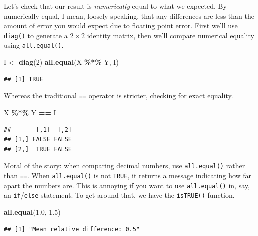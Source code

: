 \documentclass[
  12pt,
  oneside,openany]{book}
\newenvironment{Shaded}{\begin{snugshade}}{\end{snugshade}}
\newcommand{\DecValTok}[1]{\textcolor[rgb]{0.00,0.00,0.81}{#1}}
\newcommand{\FloatTok}[1]{\textcolor[rgb]{0.00,0.00,0.81}{#1}}
\newcommand{\KeywordTok}[1]{\textcolor[rgb]{0.13,0.29,0.53}{\textbf{#1}}}
\newcommand{\NormalTok}[1]{#1}
\newcommand{\OperatorTok}[1]{\textcolor[rgb]{0.81,0.36,0.00}{\textbf{#1}}}
\newcommand{\StringTok}[1]{\textcolor[rgb]{0.31,0.60,0.02}{#1}}
\begin{document}
Let's check that our result is \emph{numerically} equal to what we expected. By numerically equal, I mean, loosely speaking, that any differences are less than the amount of error you would expect due to floating point error. First we'll use \texttt{diag()} to generate a \(2 \times 2\) identity matrix, then we'll compare numerical equality using \texttt{all.equal()}.

\begin{Shaded}
\begin{Highlighting}[]
\NormalTok{I \textless{}{-}}\StringTok{ }\KeywordTok{diag}\NormalTok{(}\DecValTok{2}\NormalTok{)}
\KeywordTok{all.equal}\NormalTok{(X }\OperatorTok{\%*\%}\StringTok{ }\NormalTok{Y, I)}
\end{Highlighting}
\end{Shaded}

\begin{verbatim}
## [1] TRUE
\end{verbatim}

Whereas the traditional \texttt{==} operator is stricter, checking for exact equality.

\begin{Shaded}
\begin{Highlighting}[]
\NormalTok{X }\OperatorTok{\%*\%}\StringTok{ }\NormalTok{Y }\OperatorTok{==}\StringTok{ }\NormalTok{I}
\end{Highlighting}
\end{Shaded}

\begin{verbatim}
##       [,1]  [,2]
## [1,] FALSE FALSE
## [2,]  TRUE FALSE
\end{verbatim}

Moral of the story: when comparing decimal numbers, use \texttt{all.equal()} rather than \texttt{==}. When \texttt{all.equal()} is not \texttt{TRUE}, it returns a message indicating how far apart the numbers are. This is annoying if you want to use \texttt{all.equal()} in, say, an \texttt{if}/\texttt{else} statement. To get around that, we have the \texttt{isTRUE()} function.

\begin{Shaded}
\begin{Highlighting}[]
\KeywordTok{all.equal}\NormalTok{(}\FloatTok{1.0}\NormalTok{, }\FloatTok{1.5}\NormalTok{)}
\end{Highlighting}
\end{Shaded}

\begin{verbatim}
## [1] "Mean relative difference: 0.5"
\end{verbatim}
\end{document}
